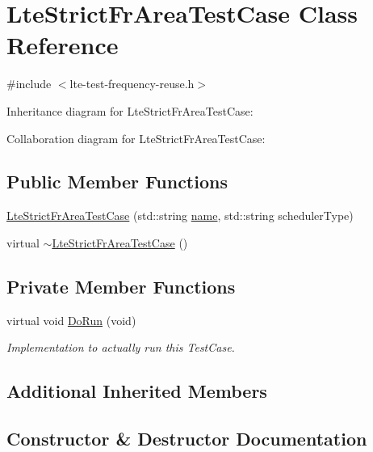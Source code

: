 \hypertarget{classLteStrictFrAreaTestCase}{}\section{Lte\+Strict\+Fr\+Area\+Test\+Case Class Reference}
\label{classLteStrictFrAreaTestCase}


{\ttfamily \#include $<$lte-\/test-\/frequency-\/reuse.\+h$>$}



Inheritance diagram for Lte\+Strict\+Fr\+Area\+Test\+Case\+:


Collaboration diagram for Lte\+Strict\+Fr\+Area\+Test\+Case\+:
\subsection*{Public Member Functions}
\begin{DoxyCompactItemize}
\item 
\hyperlink{classLteStrictFrAreaTestCase_af703bdb0aa61085bda93eca2a7f25e33}{Lte\+Strict\+Fr\+Area\+Test\+Case} (std\+::string \hyperlink{generate__test__data__lte__spectrum__model_8m_ab74e6bf80237ddc4109968cedc58c151}{name}, std\+::string scheduler\+Type)
\item 
virtual \hyperlink{classLteStrictFrAreaTestCase_a0685b18c34e494400b4da9278b4aeba7}{$\sim$\+Lte\+Strict\+Fr\+Area\+Test\+Case} ()
\end{DoxyCompactItemize}
\subsection*{Private Member Functions}
\begin{DoxyCompactItemize}
\item 
virtual void \hyperlink{classLteStrictFrAreaTestCase_a61e945e04c3b10a50c2f484198199b49}{Do\+Run} (void)
\begin{DoxyCompactList}\small\item\em Implementation to actually run this Test\+Case. \end{DoxyCompactList}\end{DoxyCompactItemize}
\subsection*{Additional Inherited Members}


\subsection{Constructor \& Destructor Documentation}
